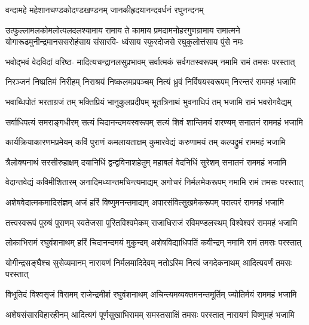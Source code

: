 \twolineshloka
{वन्दामहे महेशानचण्डकोदण्डखण्डनम्}
{जानकीहृदयानन्दवर्धनं रघुनन्दनम्}%

\fourlineindentedshloka
{उत्फुल्लामलकोमलोत्पलदलश्यामाय रामाय ते} 
{कामाय प्रमदामनोहरगुणग्रामाय रामात्मने}
{योगारूढमुनीन्द्रमानससरोहंसाय संसारवि-}
{ध्वंसाय स्फुरदोजसे रघुकुलोत्तंसाय पुंसे नमः}%

\fourlineindentedshloka
{भवोद्भवं वेदविदां वरिष्ठ}-
{मादित्यचन्द्रानलसुप्रभावम्}
{सर्वात्मकं सर्वगतस्वरूपम्}
{नमामि रामं तमसः परस्तात्}%

\fourlineindentedshloka
{निरञ्जनं निष्प्रतिमं निरीहम्} 
{निराश्रयं निष्कलमप्रपञ्चम्}
{नित्यं ध्रुवं निर्विषयस्वरूपम्}
{निरन्तरं राममहं भजामि}%

\fourlineindentedshloka
{भवाब्धिपोतं भरताग्रजं तम्} 
{भक्तिप्रियं भानुकुलप्रदीपम्}
{भूतत्रिनाथं भुवनाधिपं तम्}
{भजामि रामं भवरोगवैद्यम्}%

\fourlineindentedshloka
{सर्वाधिपत्यं समराङ्गधीरम्} 
{सत्यं चिदानन्दमयस्वरूपम्}
{सत्यं शिवं शान्तिमयं शरण्यम्}
{सनातनं राममहं भजामि}%

\fourlineindentedshloka
{कार्यक्रियाकारणमप्रमेयम्} 
{कविं पुराणं कमलायताक्षम्}
{कुमारवेद्यं करुणामयं तम्}
{कल्पद्रुमं राममहं भजामि}%

\fourlineindentedshloka
{त्रैलोक्यनाथं सरसीरुहाक्षम्} 
{दयानिधिं द्वन्द्वविनाशहेतुम्}
{महाबलं वेदनिधिं सुरेशम्}
{सनातनं राममहं भजामि}%

\fourlineindentedshloka
{वेदान्तवेद्यं कविमीशितारम्}
{अनादिमध्यान्तमचिन्त्यमाद्यम्}
{अगोचरं निर्मलमेकरूपम्}
{नमामि रामं तमसः परस्तात्}%

\fourlineindentedshloka
{अशेषवेदात्मकमादिसंज्ञम्} 
{अजं हरिं विष्णुमनन्तमाद्यम्}
{अपारसंवित्सुखमेकरूपम्}
{परात्परं राममहं भजामि}%

\fourlineindentedshloka
{तत्त्वस्वरूपं पुरुषं पुराणम्} 
{स्वतेजसा पूरितविश्वमेकम्}
{राजाधिराजं रविमण्डलस्थम्}
{विश्वेश्वरं राममहं भजामि}%

\fourlineindentedshloka
{लोकाभिरामं रघुवंशनाथम्} 
{हरिं चिदानन्दमयं मुकुन्दम्}
{अशेषविद्याधिपतिं कवीन्द्रम्}
{नमामि रामं तमसः परस्तात्}%

\fourlineindentedshloka
{योगीन्द्रसङ्घैश्च सुसेव्यमानम्} 
{नारायणं निर्मलमादिदेवम्}
{नतोऽस्मि नित्यं जगदेकनाथम्}
{आदित्यवर्णं तमसः परस्तात्}%

\fourlineindentedshloka
{विभूतिदं विश्वसृजं विरामम्} 
{राजेन्द्रमीशं रघुवंशनाथम्}
{अचिन्त्यमव्यक्तमनन्तमूर्तिम्}
{ज्योतिर्मयं राममहं भजामि}%

\fourlineindentedshloka
{अशेषसंसारविहारहीनम्}
{आदित्यगं पूर्णसुखाभिरामम्}
{समस्तसाक्षिं तमसः परस्तात्}
{नारायणं विष्णुमहं भजामि}%

